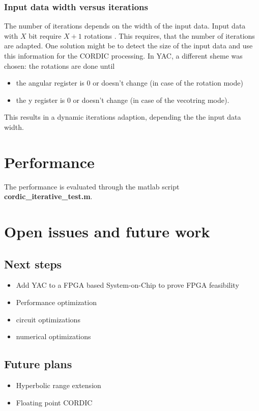 \documentclass[a4paper, 12pt, notitlepage]{report}
\newcommand{\file}[1]{\textbf{#1}}
\begin{document}
\subsection{Input data width versus iterations}
The number of iterations depends on the width of the input data. 
Input data with $X$ bit require $X+1$ rotations \cite{dawid}.
This requires, that the number of iterations are adapted. One solution might
be to detect the size of the input data and use this information for the CORDIC processing.
In YAC, a different sheme was chosen: the rotations are done until 
\begin{itemize}
   \item the angular register is 0 or doesn't change (in case of the rotation mode) 
   \item the y register is 0 or doesn't change (in case of the vecotring mode).
\end{itemize}
This results in a dynamic iterations adaption, depending the the input data width.

\chapter{Performance}
The performance is evaluated through the matlab script \file{cordic\_iterative\_test.m}.


\chapter{Open issues and future work}

   \section{Next steps}
   \begin{itemize}
      \item Add YAC to a FPGA based System-on-Chip to prove 
            FPGA feasibility
      \item Performance optimization
         \item circuit optimizations
         \item numerical optimizations
   \end{itemize}

   \section{Future plans}
   \begin{itemize}
      \item Hyperbolic range extension
      \item Floating point CORDIC 
   \end{itemize}
\end{document}
